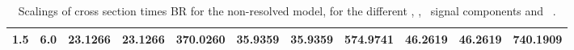\begin{landscape}
\begin{table}[h!]
\begin{tabular}{ll rrr rrr rrr}
   1.5 & 6.0    & 23.1266 & 23.1266 & 370.0260   & 35.9359 & 35.9359 & 574.9741   & 46.2619 & 46.2619 & 740.1909 \\\hline
    \end{tabular}                                                                                                                                                                          
    \caption[Scalings of $\sigma\times$BR for the signal components and \ ]{Scalings of cross section times BR for the non-resolved model, for the different \ttH, \tHq, \tHW\ signal components and \ .}\label{tab:xsbrscalingK6_1p5}                              
 \end{table}   

\end{landscape}
